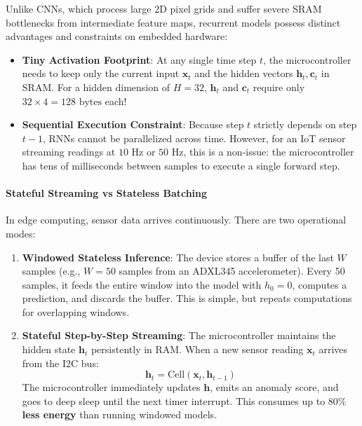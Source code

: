 \begin{iotbox}
Unlike CNNs, which process large 2D pixel grids and suffer severe SRAM bottlenecks from intermediate feature maps, recurrent models possess distinct advantages and constraints on embedded hardware:
\begin{itemize}
    \item \textbf{Tiny Activation Footprint}: At any single time step $t$, the microcontroller needs to keep only the current input $\mathbf{x}_t$ and the hidden vectors $\mathbf{h}_t, \mathbf{c}_t$ in SRAM. For a hidden dimension of $H=32$, $\mathbf{h}_t$ and $\mathbf{c}_t$ require only $32 \times 4 = 128 \text{ bytes}$ each!
    \item \textbf{Sequential Execution Constraint}: Because step $t$ strictly depends on step $t-1$, RNNs cannot be parallelized across time. However, for an IoT sensor streaming readings at $10\text{ Hz}$ or $50\text{ Hz}$, this is a non-issue: the microcontroller has tens of milliseconds between samples to execute a single forward step.
\end{itemize}
\end{iotbox}

\paragraph{Stateful Streaming vs Stateless Batching}
In edge computing, sensor data arrives continuously. There are two operational modes:
\begin{enumerate}
    \item \textbf{Windowed Stateless Inference}: The device stores a buffer of the last $W$ samples (e.g., $W = 50$ samples from an ADXL345 accelerometer). Every 50 samples, it feeds the entire window into the model with $h_0 = 0$, computes a prediction, and discards the buffer. This is simple, but repeats computations for overlapping windows.
    \item \textbf{Stateful Step-by-Step Streaming}: The microcontroller maintains the hidden state $\mathbf{h}_t$ persistently in RAM. When a new sensor reading $\mathbf{x}_t$ arrives from the I2C bus:
    \begin{equation*}
    \mathbf{h}_t = \text{Cell}(\mathbf{x}_t, \mathbf{h}_{t-1})
    \end{equation*}
    The microcontroller immediately updates $\mathbf{h}$, emits an anomaly score, and goes to deep sleep until the next timer interrupt. This consumes up to \textbf{$80\%$ less energy} than running windowed models.
\end{enumerate}

